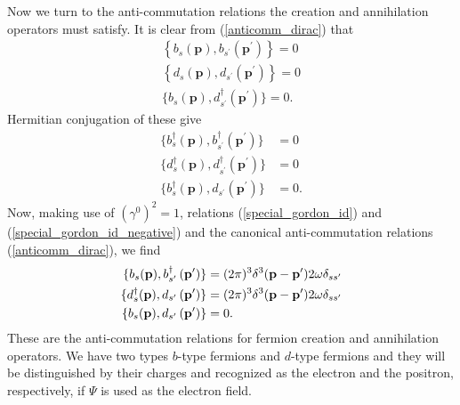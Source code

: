 Now we turn to the anti-commutation relations the creation and annihilation operators must satisfy. It is clear from (\ref{anticomm_dirac}) that
\begin{equation}
\begin{array}{l}
\left\{b_{s}(\mathbf{p}), b_{s^{\prime}}\left(\mathbf{p}^{\prime}\right)\right\}=0 \\
\left\{d_{s}(\mathbf{p}), d_{s^{\prime}}\left(\mathbf{p}^{\prime}\right)\right\}=0 \\
\{b_{s}(\mathbf{p}), d_{s^{\prime}}^{\dagger}\left(\mathbf{p}^{\prime}\right)\}=0.
\end{array}
\end{equation}
Hermitian conjugation of these give
\begin{equation}
\begin{aligned}
\{b_{s}^{\dagger}(\mathbf{p}), b_{s^{\prime}}^{\dagger}\left(\mathbf{p}^{\prime}\right)\}&=0 \\
\{d_{s}^{\dagger}(\mathbf{p}), d_{s^{\prime}}^{\dagger}\left(\mathbf{p}^{\prime}\right)\}&=0 \\
\{b_{s}^{\dagger}(\mathbf{p}), d_{s^{\prime}}\left(\mathbf{p}^{\prime}\right)\}&=0.
\end{aligned}
\end{equation}
Now, making use of $(\gamma^0)^2=1$, relations (\ref{special_gordon_id}) and  (\ref{special_gordon_id_negative}) and the canonical anti-commutation relations (\ref{anticomm_dirac}), we find
\begin{equation}
    \begin{aligned}
    \{b_{s}(\mathbf{p}), b^\dagger_{s^{\prime}}\left(\mathbf{p}^{\prime}\right)\}&=(2\pi)^3\delta^3(\vb{p}-\vb{p}^\prime)2\omega\delta_{ss^\prime} \\
    \{d^\dagger_{s}(\mathbf{p}), d_{s^{\prime}}\left(\mathbf{p}^{\prime}\right)\}&=(2\pi)^3\delta^3(\vb{p}-\vb{p}^\prime)2\omega\delta_{ss^\prime}\\
    \{b_{s}(\mathbf{p}), d_{s^{\prime}}\left(\mathbf{p}^{\prime}\right)\}&=0.
    \end{aligned}
    \label{coef_anticomm}
\end{equation}
These are the anti-commutation relations for fermion creation and annihilation operators. We have two types $b$-type fermions and $d$-type fermions and they will be distinguished by their charges and recognized as the electron and the positron, respectively, if $\Psi$ is used as the electron field.
